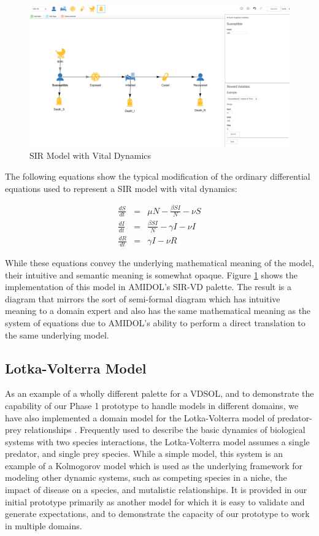 \documentclass[11pt]{article}
\newcommand{\amidol}{\textsc{AMIDOL}}
\begin{document}
\begin{figure}
\includegraphics[width=\textwidth]{figs/SIR-VD.png}
\caption{SIR Model with Vital Dynamics}
\label{Fig:SIR-VD-Draw}
\end{figure}

The following equations show the typical modification of the ordinary differential equations used to represent a SIR model with vital dynamics:

\begin{eqnarray}
  \frac{dS}{dt} &=& \mu N - \frac{\beta S I }{N} - \nu S\\
  \frac{dI}{dt} &=& \frac{\beta S I}{N} - \gamma I - \nu I\\
  \frac{dR}{dt} &=& \gamma I - \nu R
\end{eqnarray}

While these equations convey the underlying mathematical meaning of the model, their intuitive and semantic meaning is somewhat opaque.  Figure \ref{Fig:SIR-VD-Draw} shows the implementation of this model in \amidol{}'s SIR-VD palette.  The result is a diagram that mirrors the sort of semi-formal diagram which has intuitive meaning to a domain expert and also has the same mathematical meaning as the system of equations due to \amidol{}'s ability to perform a direct translation to the same underlying model.

\subsection{Lotka-Volterra Model}

As an example of a wholly different palette for a VDSOL, and to demonstrate the capability of our Phase 1 prototype to handle models in different domains, we have also implemented a domain model for the Lotka-Volterra model of predator-prey relationships \cite{freedman1980deterministic,brauer2012mathematical,hoppensteadt2006predator}.  Frequently used to describe the basic dynamics of biological systems with two species interactions, the Lotka-Volterra model assumes a single predator, and single prey species.  While a simple model, this system is an example of a Kolmogorov model which is used as the underlying framework for modeling other dynamic systems, such as competing species in a niche, the impact of disease on a species, and mutalistic relationships.  It is provided in our initial prototype primarily as another model for which it is easy to validate and generate expectations, and to demonstrate the capacity of our prototype to work in multiple domains.
\end{document}
